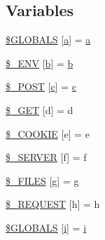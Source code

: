 \subsection*{Variables}
\begin{DoxyCompactItemize}
\item 
\mbox{\hyperlink{_test_case_test_8php_aed1bacf239df2cb42524ef1763b60f19}{\$\+G\+L\+O\+B\+A\+LS}} \mbox{[}\textquotesingle{}\mbox{\hyperlink{interfacea}{a}}\textquotesingle{}\mbox{]} = \textquotesingle{}\mbox{\hyperlink{interfacea}{a}}\textquotesingle{}
\item 
\mbox{\hyperlink{_test_case_test_8php_a23336d3a893ac3a924c7799fcf516794}{\$\+\_\+\+E\+NV}} \mbox{[}\textquotesingle{}\mbox{\hyperlink{interfaceb}{b}}\textquotesingle{}\mbox{]} = \textquotesingle{}\mbox{\hyperlink{interfaceb}{b}}\textquotesingle{}
\item 
\mbox{\hyperlink{_test_case_test_8php_a33f120468cd619a116e0c103281b6e3c}{\$\+\_\+\+P\+O\+ST}} \mbox{[}\textquotesingle{}\mbox{\hyperlink{classc}{c}}\textquotesingle{}\mbox{]} = \textquotesingle{}\mbox{\hyperlink{classc}{c}}\textquotesingle{}
\item 
\mbox{\hyperlink{_test_case_test_8php_a870d7ef9d464a1290f1cbda7d66895a6}{\$\+\_\+\+G\+ET}} \mbox{[}\textquotesingle{}d\textquotesingle{}\mbox{]} = \textquotesingle{}d\textquotesingle{}
\item 
\mbox{\hyperlink{_test_case_test_8php_a0a86d3c4fae5431630337e26b10144e0}{\$\+\_\+\+C\+O\+O\+K\+IE}} \mbox{[}\textquotesingle{}e\textquotesingle{}\mbox{]} = \textquotesingle{}e\textquotesingle{}
\item 
\mbox{\hyperlink{_test_case_test_8php_a969db04085751b9c5e08fd6814cb23a5}{\$\+\_\+\+S\+E\+R\+V\+ER}} \mbox{[}\textquotesingle{}f\textquotesingle{}\mbox{]} = \textquotesingle{}f\textquotesingle{}
\item 
\mbox{\hyperlink{_test_case_test_8php_a794ab2c77ef08d1f140e3f95fa4f9837}{\$\+\_\+\+F\+I\+L\+ES}} \mbox{[}\textquotesingle{}g\textquotesingle{}\mbox{]} = \textquotesingle{}g\textquotesingle{}
\item 
\mbox{\hyperlink{_test_case_test_8php_ae161a49d41cb8b39e60d0aca916b3f22}{\$\+\_\+\+R\+E\+Q\+U\+E\+ST}} \mbox{[}\textquotesingle{}h\textquotesingle{}\mbox{]} = \textquotesingle{}h\textquotesingle{}
\item 
\mbox{\hyperlink{_test_case_test_8php_a7297372963b342dcd4b4fcbaea2da0f0}{\$\+G\+L\+O\+B\+A\+LS}} \mbox{[}\textquotesingle{}\mbox{\hyperlink{interfacei}{i}}\textquotesingle{}\mbox{]} = \textquotesingle{}\mbox{\hyperlink{interfacei}{i}}\textquotesingle{}
\end{DoxyCompactItemize}


